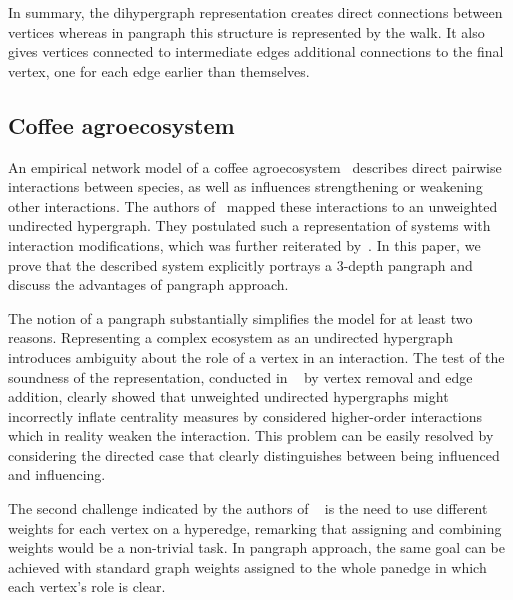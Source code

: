 \documentclass[a4paper,12pt]{article}
\theoremstyle{definition}
\theoremstyle{remark}
\begin{document}
In summary, the dihypergraph representation creates direct connections between vertices whereas in pangraph this structure is represented by the walk. It also gives vertices connected to intermediate edges additional connections to the final vertex, one for each edge earlier than themselves.

\subsection{Coffee agroecosystem}\label{sec:coffee_agroeco}

An empirical network model of a coffee agroecosystem~\cite{Vandermeer_2010, Perfecto_coffe_agroeco, GOLUBSKI2016344} describes direct pairwise interactions between species, as well as influences strengthening or weakening other interactions. The authors of~\cite{GOLUBSKI2016344} mapped these interactions to an unweighted undirected hypergraph. They postulated such a representation of systems with interaction modifications, which was further reiterated by~\cite{BATTISTON20201}. In this paper, we prove that the described system explicitly portrays a 3-depth pangraph and discuss the advantages of pangraph approach. 

The notion of a pangraph substantially simplifies the model for at least two reasons. Representing a complex ecosystem as an undirected hypergraph introduces ambiguity about the role of a vertex in an interaction. The test of the soundness of the representation, conducted in ~\cite{GOLUBSKI2016344} by vertex removal and edge addition, clearly showed that unweighted undirected hypergraphs might incorrectly inflate centrality measures by considered higher-order interactions which in reality weaken the interaction. This problem can be easily resolved by considering the directed case that clearly distinguishes between being influenced and influencing. 

The second challenge indicated by the authors of ~\cite{GOLUBSKI2016344} is the need to use different weights for each vertex on a hyperedge, remarking that assigning and combining weights would be a non-trivial task. In pangraph approach, the same goal can be achieved with standard graph weights assigned to the whole panedge in which each vertex's role is clear.
\end{document}
